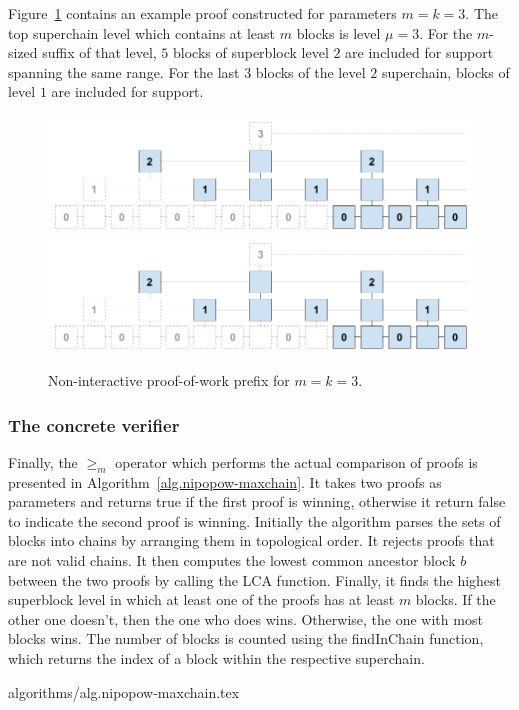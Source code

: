 
Figure~\ref{fig.nipopow} contains an example proof constructed for parameters
$m = k = 3$. The top superchain level which contains at least $m$ blocks is
level $\mu = 3$. For the $m$-sized suffix of that level, $5$ blocks of
superblock level $2$ are included for support spanning the same range. For the
last $3$ blocks of the level $2$ superchain, blocks of level $1$ are included
for support.

\begin{figure}[h]
    \caption{Non-interactive proof-of-work prefix for $m=k = 3$.}
    \centering
    \iftwocolumn
        \includegraphics[width=\columnwidth,keepaspectratio]{figures/non-interactive-popow.png}
    \else
        \includegraphics[width=0.7\columnwidth,keepaspectratio]{figures/non-interactive-popow.png}
    \fi
    \label{fig.nipopow}
\end{figure}

\subsubsection{The concrete verifier}

Finally, the $\geq_m$ operator which performs the actual comparison of proofs
is presented in Algorithm~\ref{alg.nipopow-maxchain}. It takes two proofs as
parameters and returns true if the first proof is winning, otherwise it return
false to indicate the second proof is winning. Initially the algorithm parses
the sets of blocks into chains by arranging them in topological order. It
rejects proofs that are not valid chains. It then computes the lowest common
ancestor block $b$ between the two proofs by calling the LCA function. Finally,
it finds the highest superblock level in which at least one of the proofs has
at least $m$ blocks. If the other one doesn't, then the one who does wins.
Otherwise, the one with most blocks wins. The number of blocks is counted using
the findInChain function, which returns the index of a block within the
respective superchain.

{algorithms/alg.nipopow-maxchain.tex}
